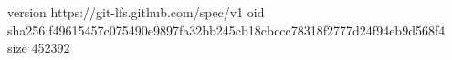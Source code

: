 version https://git-lfs.github.com/spec/v1
oid sha256:f49615457c075490e9897fa32bb245cb18cbccc78318f2777d24f94eb9d568f4
size 452392
